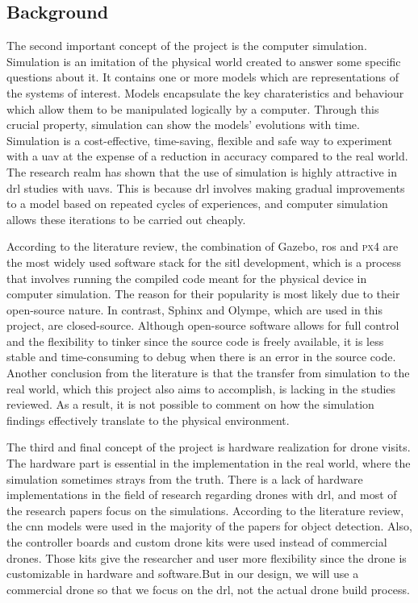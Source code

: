 \documentclass[../main.tex]{subfiles}
\begin{document}
\subsection{Background}

The second important concept of the project is the computer simulation.
Simulation is an imitation of the physical world
created to answer some specific questions about it.
It contains one or more models 
which are representations of the systems of interest.
Models encapsulate the key charateristics and behaviour 
which allow them to be manipulated logically by a computer.
Through this crucial property, simulation can show 
the models' evolutions with time.
Simulation is a cost-effective, time-saving, flexible 
and safe way to experiment with a \gls{uav}
at the expense of a reduction in accuracy compared to the real world.
The research realm has shown that the use of simulation 
is highly attractive in \gls{drl} studies with \glspl{uav}.
This is because \gls{drl} involves
making gradual improvements to a model based on 
repeated cycles of experiences, and computer simulation 
allows these iterations to be carried out cheaply.

According to the literature review, 
the combination of Gazebo, \gls{ros}
and \textsc{px4} are the most widely used software stack 
for the \gls{sitl} development,
which is a process that involves running the compiled code
meant for the physical device in computer simulation.
The reason for their popularity is most likely 
due to their open-source nature. 
In contrast, Sphinx and Olympe, which are used in this project, 
are closed-source.
Although open-source software 
allows for full control and the flexibility to tinker
since the source code is freely available,
it is less stable and time-consuming to debug
when there is an error in the source code.
Another conclusion from the literature is that 
the transfer from simulation to the real world,
which this project also aims to accomplish,
is lacking in the studies reviewed.
As a result, it is not possible to comment on 
how the simulation findings effectively translate
to the physical environment.

The third and final concept of the project 
is hardware realization for drone visits.
The hardware part is essential in the implementation 
in the real world, where the simulation 
sometimes strays from the truth.
There is a lack of hardware implementations in 
the field of research regarding drones with \gls{drl}, 
and most of the research papers focus on the simulations.
According to the literature review, the \gls{cnn} 
models were used in the majority of the papers for object detection. 
Also, the controller boards and custom drone kits 
were used instead of commercial drones.
Those kits give the researcher and user more flexibility 
since the drone is customizable 
in hardware and software.But in our design, 
we will use a commercial drone so that we focus
on the \gls{drl}, not the actual drone build process. 
\end{document}

